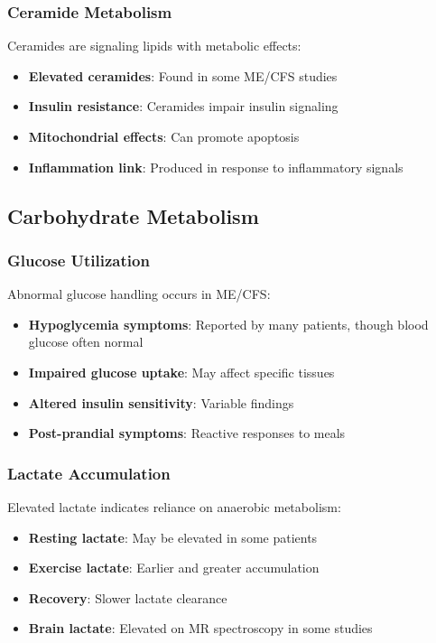 \subsubsection{Ceramide Metabolism}

Ceramides are signaling lipids with metabolic effects:

\begin{itemize}
    \item \textbf{Elevated ceramides}: Found in some ME/CFS studies
    \item \textbf{Insulin resistance}: Ceramides impair insulin signaling
    \item \textbf{Mitochondrial effects}: Can promote apoptosis
    \item \textbf{Inflammation link}: Produced in response to inflammatory signals
\end{itemize}

\subsection{Carbohydrate Metabolism}
\label{sec:carbohydrate}

\subsubsection{Glucose Utilization}

Abnormal glucose handling occurs in ME/CFS:

\begin{itemize}
    \item \textbf{Hypoglycemia symptoms}: Reported by many patients, though blood glucose often normal
    \item \textbf{Impaired glucose uptake}: May affect specific tissues
    \item \textbf{Altered insulin sensitivity}: Variable findings
    \item \textbf{Post-prandial symptoms}: Reactive responses to meals
\end{itemize}

\subsubsection{Lactate Accumulation}

Elevated lactate indicates reliance on anaerobic metabolism:

\begin{itemize}
    \item \textbf{Resting lactate}: May be elevated in some patients
    \item \textbf{Exercise lactate}: Earlier and greater accumulation
    \item \textbf{Recovery}: Slower lactate clearance
    \item \textbf{Brain lactate}: Elevated on MR spectroscopy in some studies
\end{itemize}

